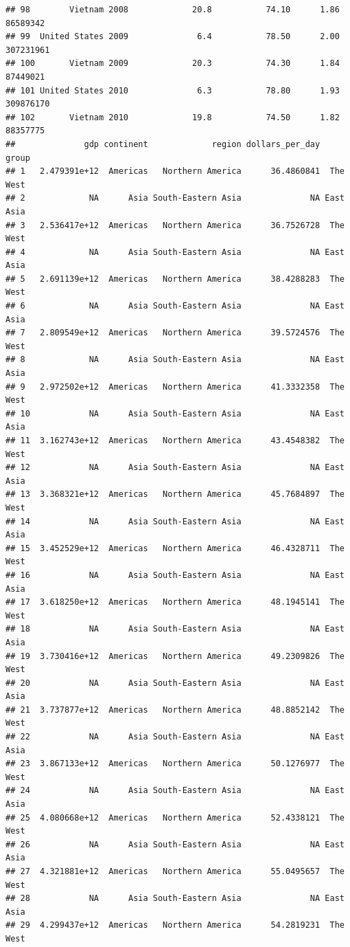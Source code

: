 \documentclass[
]{article}
\begin{document}
\begin{verbatim}
## 98        Vietnam 2008             20.8           74.10      1.86   86589342
## 99  United States 2009              6.4           78.50      2.00  307231961
## 100       Vietnam 2009             20.3           74.30      1.84   87449021
## 101 United States 2010              6.3           78.80      1.93  309876170
## 102       Vietnam 2010             19.8           74.50      1.82   88357775
##              gdp continent             region dollars_per_day     group
## 1   2.479391e+12  Americas   Northern America      36.4860841  The West
## 2             NA      Asia South-Eastern Asia              NA East Asia
## 3   2.536417e+12  Americas   Northern America      36.7526728  The West
## 4             NA      Asia South-Eastern Asia              NA East Asia
## 5   2.691139e+12  Americas   Northern America      38.4288283  The West
## 6             NA      Asia South-Eastern Asia              NA East Asia
## 7   2.809549e+12  Americas   Northern America      39.5724576  The West
## 8             NA      Asia South-Eastern Asia              NA East Asia
## 9   2.972502e+12  Americas   Northern America      41.3332358  The West
## 10            NA      Asia South-Eastern Asia              NA East Asia
## 11  3.162743e+12  Americas   Northern America      43.4548382  The West
## 12            NA      Asia South-Eastern Asia              NA East Asia
## 13  3.368321e+12  Americas   Northern America      45.7684897  The West
## 14            NA      Asia South-Eastern Asia              NA East Asia
## 15  3.452529e+12  Americas   Northern America      46.4328711  The West
## 16            NA      Asia South-Eastern Asia              NA East Asia
## 17  3.618250e+12  Americas   Northern America      48.1945141  The West
## 18            NA      Asia South-Eastern Asia              NA East Asia
## 19  3.730416e+12  Americas   Northern America      49.2309826  The West
## 20            NA      Asia South-Eastern Asia              NA East Asia
## 21  3.737877e+12  Americas   Northern America      48.8852142  The West
## 22            NA      Asia South-Eastern Asia              NA East Asia
## 23  3.867133e+12  Americas   Northern America      50.1276977  The West
## 24            NA      Asia South-Eastern Asia              NA East Asia
## 25  4.080668e+12  Americas   Northern America      52.4338121  The West
## 26            NA      Asia South-Eastern Asia              NA East Asia
## 27  4.321881e+12  Americas   Northern America      55.0495657  The West
## 28            NA      Asia South-Eastern Asia              NA East Asia
## 29  4.299437e+12  Americas   Northern America      54.2819231  The West

\end{verbatim}
\end{document}
